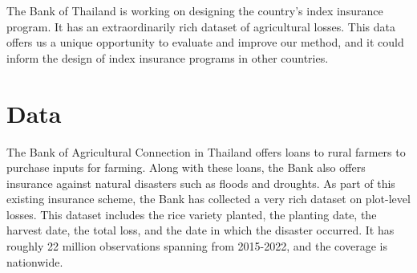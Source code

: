 \documentclass[12pt]{article}
\begin{document}
The Bank of Thailand is working on designing the country's index insurance program. It has an extraordinarily rich dataset of agricultural losses. This data offers us a unique opportunity to evaluate and improve our method, and it could inform the design of index insurance programs in other countries. 

\section{Data}
The Bank of Agricultural Connection in Thailand offers loans to rural farmers to purchase inputs for farming. Along with these loans, the Bank also offers insurance against natural disasters such as floods and droughts. As part of this existing insurance scheme, the Bank has collected a very rich dataset on plot-level losses. This dataset includes the rice variety planted, the planting date, the harvest date, the total loss, and the date in which the disaster occurred. It has roughly 22 million observations spanning from 2015-2022, and the coverage is nationwide. 
\end{document}
